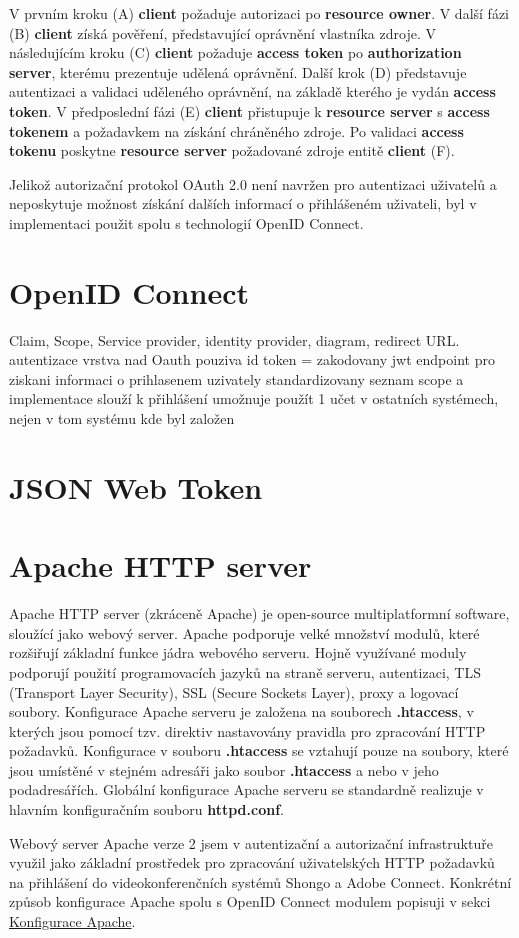 \documentclass[
  printed, %
  twoside, %
  table,   %
  nolof,     %
  nolot,     %
]{fithesis3}
\begin{document}
V prvním kroku (A) \textbf{client} požaduje autorizaci po \textbf{resource owner}. V další fázi (B) \textbf{client} získá pověření, představující oprávnění vlastníka zdroje. V následujícím kroku (C) \textbf{client} požaduje \textbf{access token} po \textbf{authorization server}, kterému prezentuje udělená oprávnění. Další krok (D) představuje autentizaci a validaci uděleného oprávnění, na základě kterého je vydán \textbf{access token}. V předposlední fázi (E) \textbf{client} přistupuje k \textbf{resource server} s \textbf{access tokenem} a požadavkem na získání chráněného zdroje. Po validaci \textbf{access tokenu} poskytne \textbf{resource server} požadované zdroje entitě \textbf{client} (F). \par 
Jelikož autorizační protokol OAuth 2.0 není navržen pro autentizaci uživatelů a neposkytuje možnost získání dalších informací o přihlášeném uživateli, byl v implementaci použit spolu s technologií OpenID Connect. 

\section{OpenID Connect}
Claim, Scope, Service provider, identity provider, diagram, redirect URL.
autentizace
vrstva nad Oauth
pouziva id token = zakodovany jwt
endpoint pro ziskani informaci o prihlasenem uzivately
standardizovany seznam scope a implementace
slouží k přihlášení 
umožnuje použít 1 učet v ostatních systémech, nejen v tom systému kde byl založen
\section{JSON Web Token}
\section{Apache HTTP server}
Apache HTTP server \cite{apache} (zkráceně Apache) je open-source multiplatformní software, sloužící jako webový server. Apache podporuje velké množství modulů, které rozšiřují základní funkce jádra webového serveru. Hojně využívané moduly podporují použití programovacích jazyků na straně serveru, autentizaci, TLS (Transport Layer Security), SSL (Secure Sockets Layer), proxy a logovací soubory. Konfigurace Apache serveru je založena na souborech \textbf{.htaccess}, v kterých jsou pomocí tzv. direktiv nastavovány pravidla pro zpracování HTTP požadavků. Konfigurace v souboru \textbf{.htaccess} se vztahují pouze na soubory, které jsou umístěné v stejném adresáři jako soubor \textbf{.htaccess} a nebo v jeho podadresářích. Globální konfigurace Apache serveru se standardně realizuje v hlavním konfiguračním souboru \textbf{httpd.conf}. \par
Webový server Apache verze 2 jsem v autentizační a autorizační infrastruktuře využil jako základní prostředek pro zpracování uživatelských HTTP požadavků na přihlášení do videokonferenčních systémů Shongo a Adobe Connect. Konkrétní způsob konfigurace Apache spolu s OpenID Connect modulem popisuji v sekci \hyperref[apacheConfig]{Konfigurace Apache}.
\end{document}
